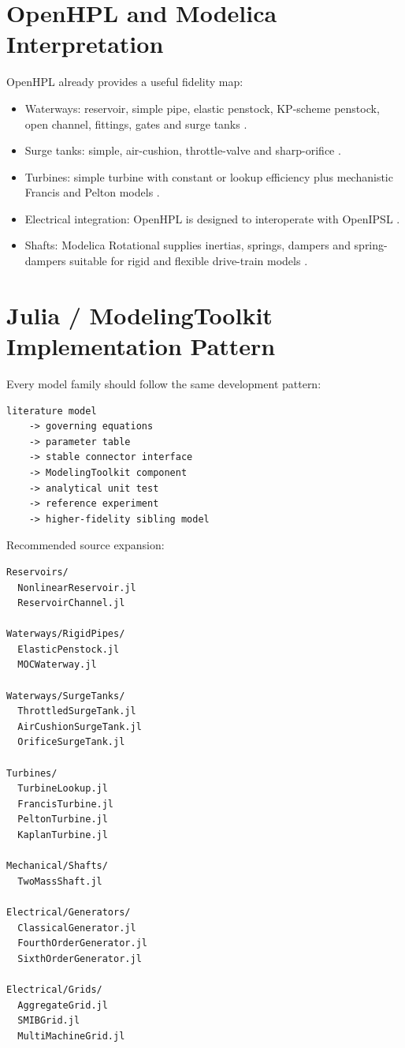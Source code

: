 \documentclass[10pt,a4paper]{article}
\begin{document}
\section{OpenHPL and Modelica Interpretation}
OpenHPL already provides a useful fidelity map:
\begin{itemize}
\item Waterways: reservoir, simple pipe, elastic penstock, KP-scheme penstock, open channel, fittings, gates and surge tanks \cite{OpenHPLWaterway}.
\item Surge tanks: simple, air-cushion, throttle-valve and sharp-orifice \cite{OpenHPLSurge}.
\item Turbines: simple turbine with constant or lookup efficiency plus mechanistic Francis and Pelton models \cite{OpenHPLSimpleTurbine,OpenHPLFrancis}.
\item Electrical integration: OpenHPL is designed to interoperate with OpenIPSL \cite{OpenHPLGuide}.
\item Shafts: Modelica Rotational supplies inertias, springs, dampers and spring-dampers suitable for rigid and flexible drive-train models \cite{MSLRotational}.
\end{itemize}

\section{Julia / ModelingToolkit Implementation Pattern}
Every model family should follow the same development pattern:
\begin{lstlisting}
literature model
    -> governing equations
    -> parameter table
    -> stable connector interface
    -> ModelingToolkit component
    -> analytical unit test
    -> reference experiment
    -> higher-fidelity sibling model
\end{lstlisting}

Recommended source expansion:
\begin{lstlisting}
Reservoirs/
  NonlinearReservoir.jl
  ReservoirChannel.jl

Waterways/RigidPipes/
  ElasticPenstock.jl
  MOCWaterway.jl

Waterways/SurgeTanks/
  ThrottledSurgeTank.jl
  AirCushionSurgeTank.jl
  OrificeSurgeTank.jl

Turbines/
  TurbineLookup.jl
  FrancisTurbine.jl
  PeltonTurbine.jl
  KaplanTurbine.jl

Mechanical/Shafts/
  TwoMassShaft.jl

Electrical/Generators/
  ClassicalGenerator.jl
  FourthOrderGenerator.jl
  SixthOrderGenerator.jl

Electrical/Grids/
  AggregateGrid.jl
  SMIBGrid.jl
  MultiMachineGrid.jl
\end{lstlisting}
\end{document}

